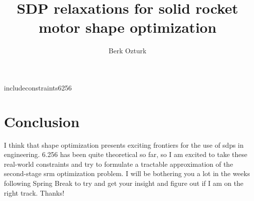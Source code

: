 \documentclass[11pt]{article}
\begin{document}
    \title{SDP relaxations for solid rocket motor shape optimization}
    \author{Berk Ozturk}
    \maketitle

    

    

    

    

    include{constraints6256}

    \section{Conclusion}

    I think that shape optimization presents exciting frontiers for the use of \gls{sdp}s in engineering. 6.256 has been quite theoretical so far, so I am excited to take these real-world constraints and try to formulate a tractable approximation of the second-stage \gls{srm} optimization problem. I will be bothering you a lot in the weeks following Spring Break to try and get your insight and figure out if I am on the right track. Thanks!
\end{document}
